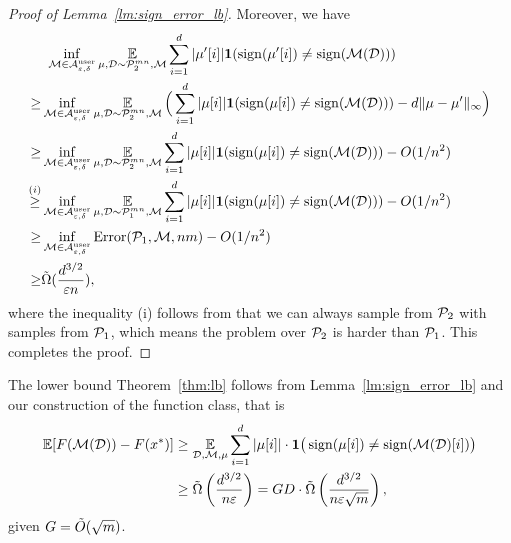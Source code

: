 \begin{proof}[Proof of Lemma~\ref{lm:sign_error_lb}]
Moreover, we have
\begin{align*}
&~\inf_{\calM\in\PAuser}\E_{\mu,\calD\sim\calP_2^{mn},\calM}\sum_{i=1}^{d}|\mu'[i]|\ind(\sign(\mu'[i])\neq \sign(\calM(\calD)))\\
\ge &  \inf_{\calM\in\PAuser}\E_{\mu,\calD\sim\calP_2^{mn},\calM}\Big(\sum_{i=1}^{d}|\mu[i]|\ind(\sign(\mu[i])\neq \sign(\calM(\calD)))-d\|\mu-\mu'\|_\infty\Big)\\
\ge & \inf_{\calM\in\PAuser}\E_{\mu,\calD\sim\calP_2^{mn},\calM}\sum_{i=1}^{d}|\mu[i]|\ind(\sign(\mu[i])\neq \sign(\calM(\calD)))- O(1/n^2)\\
\stackrel{(i)}{\ge} & \inf_{\calM\in\PAuser}\E_{\mu,\calD\sim\calP_1^{mn},\calM}\sum_{i=1}^{d}|\mu[i]|\ind(\sign(\mu[i])\neq \sign(\calM(\calD)))- O(1/n^2)\\
\ge & \inf_{\calM\in\PAuser}\Error(\calP_1,\calM,nm)-O(1/n^2)\\
\ge & \Tilde{\Omega}(\frac{d^{3/2}}{\epsilon n}),
\end{align*}
where the inequality (i) follows from that we can always sample from $\calP_2$ with samples from $\calP_1$, which means  the problem over $\calP_2$ is harder than $\calP_1$.
This completes the proof.
\end{proof}

The lower bound Theorem~\ref{thm:lb} follows from Lemma~\ref{lm:sign_error_lb} and our construction of the function class, that is
\begin{align*}
    \E[F(\calM(\calD))-F(x^*)] 
    & \ge \E_{\calD,\calM,\mu}\sum_{i=1}^{d} |\mu[i]|\cdot \ind\big(\sign(\mu[i])\neq\sign(\calM(\calD)[i])\big) \\
    & \ge \Tilde{\Omega} \left(\frac{d^{3/2}}{n\epsilon} \right)= GD \cdot \Tilde{\Omega} \left(\frac{d^{3/2}}{n\epsilon \sqrt{m}} \right),
\end{align*}
given $G=\Tilde{O}(\sqrt{m})$.